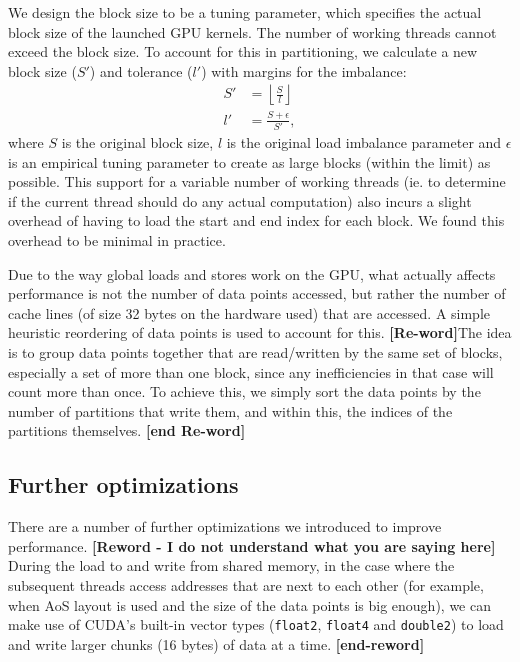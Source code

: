 We design the block size to be a tuning parameter, which specifies the actual
block size of the launched GPU kernels. The number of working threads
cannot exceed the block size. To account for this in partitioning, we calculate 
a new block size ($S'$) and tolerance ($l'$) with margins for the imbalance:
\begin{align}
  S' &= \left\lfloor \frac{S}{l} \right\rfloor \\
  l' &= \frac{S + \epsilon}{S'},
\end{align}
where $S$ is the original block size, $l$ is the original load imbalance
parameter and $\epsilon$ is an empirical tuning parameter to create as large
blocks (within the limit) as possible. This support for a variable number of 
working threads (ie. to determine if the current thread should do any actual 
computation) also incurs a slight overhead of having to load the start and end 
index for each block. We found this overhead to be minimal in practice.

Due to the way global loads and stores work on the GPU, what actually affects
performance is not the number of data points accessed, but rather the number of
cache lines (of size 32 bytes on the hardware used) that are accessed. A simple 
heuristic reordering of data points is used to account for this. 
\textbf{[Re-word]}The idea is to group data points together that are 
read/written by the same set of blocks, especially a set of more than one block, 
since any inefficiencies in that case will count more than once. To achieve 
this, we simply sort the data points by the number of partitions that write 
them, and within this, the indices of the partitions themselves. 
\textbf{[end Re-word]}

\subsection{Further optimizations}\label{optimisations}

\noindent There are a number of further optimizations we introduced to improve
performance. \textbf{[Reword - I do not understand what you are saying here]}
During the load to and write from shared memory, in the case where the
subsequent threads access addresses that are next to each other (for example,
when AoS layout is used and the size of the data points is big enough), we can
make use of CUDA's built-in vector types (\lstinline!float2!, \lstinline!float4!
and \lstinline!double2!) to load and write larger chunks (16 bytes) of data at a
time. \textbf{[end-reword]}


